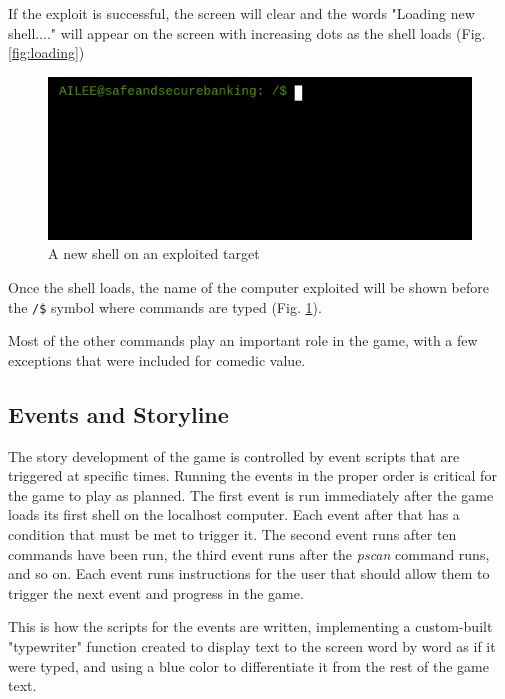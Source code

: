 \documentclass[conference]{IEEEtran}
\begin{document}
If the exploit is successful, the screen will clear and the words "Loading new shell...." will appear on the screen with increasing dots as the shell loads (Fig. \ref{fig:loading})

\begin{figure}[h]
	\centerline{\includegraphics[scale=2]{access-granted}}
	\caption{A new shell on an exploited target}
	\label{fig:access}
\end{figure}

Once the shell loads, the name of the computer exploited will be shown before the \texttt{/\$} symbol where commands are typed (Fig. \ref{fig:access}).

Most of the other commands play an important role in the game, with a few exceptions that were included for comedic value.

\subsection{Events and Storyline}

The story development of the game is controlled by event scripts that are triggered at specific times. Running the events in the proper order is critical for the game to play as planned. The first event is run immediately after the game loads its first shell on the localhost computer. Each event after that has a condition that must be met to trigger it. The second event runs after ten commands have been run, the third event runs after the \textit{pscan} command runs, and so on. Each event runs instructions for the user that should allow them to trigger the next event and progress in the game.



This is how the scripts for the events are written, implementing a custom-built "typewriter" function created to display text to the screen word by word as if it were typed, and using a blue color to differentiate it from the rest of the game text. 
\end{document}
